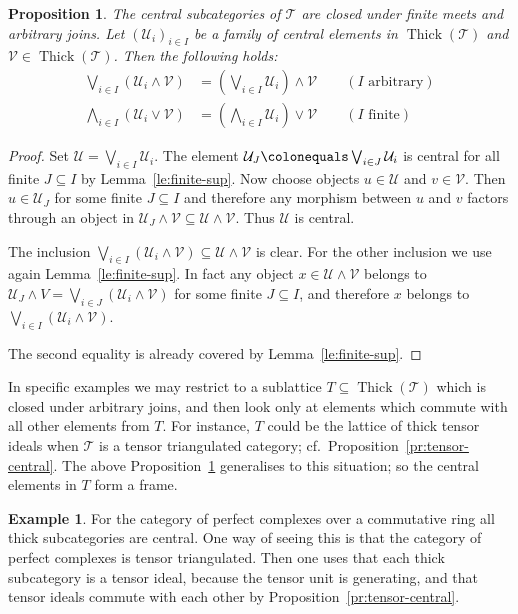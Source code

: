 \documentclass{amsart}[a4]
\newtheorem{proposition}[theorem]{Proposition}
\theoremstyle{definition}
\newtheorem{example}[theorem]{Example}
\theoremstyle{remark}
\numberwithin{equation}{section}
\newcommand{\Thick}{\operatorname{Thick}}
\newcommand{\cat}{\mathcal}
\begin{document}
\begin{proposition}\label{pr:centre}
  The central subcategories of $\cat T$ are closed under finite meets
  and arbitrary joins.  Let $(\cat U_i)_{i\in I}$ be a family of
  central elements in $\Thick(\cat T)$ and $\cat V\in\Thick(\cat
  T)$. Then the following holds:
 \begin{align*}
   \bigvee_{i\in I}(\cat U_i\wedge \cat V)&=\left(\bigvee_{i\in
   I}\cat U_i\right)\wedge\cat V\qquad (I\text{ arbitrary})\\
   \bigwedge_{i\in I}(\cat U_i\vee \cat V)&=\left(\bigwedge_{i\in
   I}\cat U_i\right)\vee\cat V\qquad (I\text{ finite})
 \end{align*}
\end{proposition}
\begin{proof}
  Set $\cat U=\bigvee_{i\in I}\cat U_i$. The element
  $\cat U_J\colonequals\bigvee_{i\in J}\cat U_i$ is central for all finite $J\subseteq I$
  by Lemma~\ref{le:finite-sup}.  Now choose objects $u\in\cat U$ and
  $v\in\cat V$. Then $u\in\cat U_J$ for some finite $J\subseteq I$ and
  therefore any morphism between $u$ and $v$ factors through an object
  in $\cat U_J\wedge \cat V\subseteq \cat U\wedge \cat V$. Thus $\cat U$ is central.

  The inclusion
  $\bigvee_{i\in I}(\cat U_i\wedge \cat V)\subseteq\cat U\wedge\cat V$
  is clear. For the other inclusion we use again
  Lemma~\ref{le:finite-sup}. In fact any object
  $x\in\cat U\wedge \cat V$ belongs to
  $\cat U_J\wedge V=\bigvee_{i\in J}(\cat U_i\wedge \cat V)$ for some
  finite $J\subseteq I$, and therefore $x$ belongs to
  $\bigvee_{i\in I}(\cat U_i\wedge \cat V)$.

  The second equality is already covered by Lemma~\ref{le:finite-sup}.
\end{proof}


In specific examples we may restrict to a sublattice
$T\subseteq \Thick(\cat T)$ which is closed under arbitrary joins, and then
look only at elements which commute with all other elements from $T$.
For instance, $T$ could be the lattice of thick tensor ideals when
$\cat T$ is a tensor triangulated category; cf.\
Proposition~\ref{pr:tensor-central}. The above Proposition~\ref{pr:centre}
generalises to this situation; so the central elements in $T$ form a
frame.

\begin{example}
  For the category of perfect complexes over a commutative ring all
  thick subcategories are central. One way of seeing this is that the
  category of perfect complexes is tensor triangulated. Then one uses
  that each thick subcategory is a tensor ideal, because the tensor
  unit is generating, and that tensor ideals commute with each other
  by Proposition~\ref{pr:tensor-central}.
\end{example}
\end{document}
